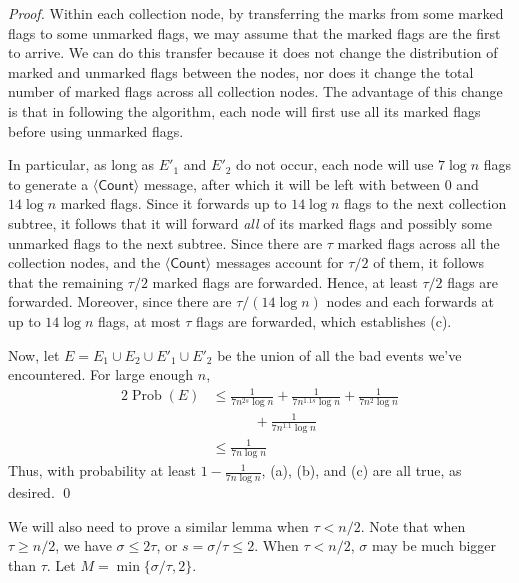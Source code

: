 \documentclass[11pt,letter]{article}
\DeclareMathOperator*{\Prob}{Prob}
\theoremstyle{mytheoremstyle}
\newcommand{\countm}{$\langle\mathsf{Count}\rangle$\xspace}
\begin{document}
\begin{proof}
	Within each collection node, by transferring the marks from some marked flags to some unmarked flags, we may assume that the marked flags are the first to arrive. We can do this transfer because it does not change the distribution of marked and unmarked flags between the nodes, nor does it change the total number of marked flags across all collection nodes. The advantage of this change is that in following the algorithm, each node will first use all its marked flags before using unmarked flags.
	
	In particular, as long as $E'_1$ and $E'_2$ do not occur, each node will use $7\log{n}$ flags to generate a \countm message, after which it will be left with between 0 and $14\log{n}$ marked flags. Since it forwards up to $14\log{n}$ flags to the next collection subtree, it follows that it will forward \emph{all} of its marked flags and possibly some unmarked flags to the next subtree. Since there are $\tau$ marked flags across all the collection nodes, and the \countm messages account for $\tau/2$ of them, it follows that the remaining $\tau/2$ marked flags are forwarded. Hence, at least $\tau/2$ flags are forwarded. Moreover, since there are $\tau/(14\log{n})$ nodes and each forwards at up to $14\log{n}$ flags, at most $\tau$ flags are forwarded, which establishes (c).
	
	Now, let $E = E_1 \cup E_2 \cup E'_1 \cup E'_2$ be the union of all the bad events we've encountered.
	For large enough $n$,
	\begin{alignat*}{2}
	\Prob(E) &\le \frac{1}{7n^{2s}\log{n}} + \frac{1}{7n^{1.1s}\log{n}} + \frac{1}{7n^{2}\log{n}} \\
	&\quad\quad\quad + \frac{1}{7n^{1.1}\log{n}} \\
	&\le \frac{1}{7n\log{n}}
	\end{alignat*}
	Thus, with probability at least $1-\frac{1}{7n\log{n}}$, (a), (b), and (c) are all true, as desired.
	\qed
\end{proof}

We will also need to prove a similar lemma when $\tau < n/2$.
Note that when $\tau \ge n/2$, we have $\sigma \le 2\tau$, or $s = \sigma/\tau \le 2$. When $\tau < n/2$, $\sigma$ may be much bigger than $\tau$. Let $M = \min\{ \sigma/\tau, 2\}$.
\end{document}
